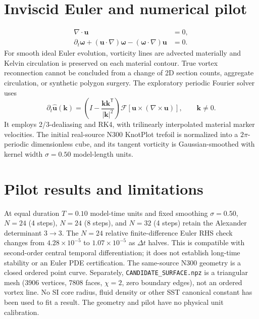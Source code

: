 \documentclass[11pt,a4paper]{article}
\begin{document}
\section{Inviscid Euler and numerical pilot}
\begin{align}
\nabla\cdot\mathbf{u}&=0,\\
\partial_t\boldsymbol{\omega}
 +(\mathbf{u}\cdot\nabla)\boldsymbol{\omega}
 -(\boldsymbol{\omega}\cdot\nabla)\mathbf{u}&=0.
\end{align}
For smooth ideal Euler evolution, vorticity lines are advected materially and
Kelvin circulation is preserved on each material contour. True vortex
reconnection cannot be concluded from a change of 2D section counts, aggregate
circulation, or synthetic polygon surgery.
The exploratory periodic Fourier solver uses
\begin{equation}
\partial_t\hat{\mathbf u}(\mathbf{k})=
\left(I-\frac{\mathbf{k}\mathbf{k}^\mathsf{T}}{|\mathbf{k}|^2}\right)
\mathcal{F}[\mathbf{u}\times(\nabla\times\mathbf{u})],\qquad\mathbf k\neq0.
\end{equation}
It employs 2/3-dealiasing and RK4, with trilinearly interpolated material
marker velocities. The initial real-source N300 KnotPlot trefoil is normalized
into a $2\pi$-periodic dimensionless cube, and its tangent vorticity is
Gaussian-smoothed with kernel width $\sigma=0.50$ model-length units.
\section{Pilot results and limitations}
At equal duration $T=0.10$ model-time units and fixed smoothing $\sigma=0.50$,
$N=24$ (4 steps), $N=24$ (8 steps), and $N=32$ (4 steps) retain the Alexander
determinant $3\to3$. The $N=24$ relative finite-difference Euler RHS check
changes from $4.28\times10^{-5}$ to $1.07\times10^{-5}$ as $\Delta t$ halves.
This is compatible with second-order central temporal differentiation; it does
not establish long-time stability or an Euler PDE certification.
The same-source N300 geometry is a closed ordered point curve. Separately,
\texttt{CANDIDATE\_SURFACE.npz} is a triangular mesh (3906 vertices, 7808 faces,
$\chi=2$, zero boundary edges), not an ordered vortex line.
No SI core radius, fluid density or other SST canonical constant has been used
to fit a result. The geometry and pilot have no physical unit calibration.
\end{document}
